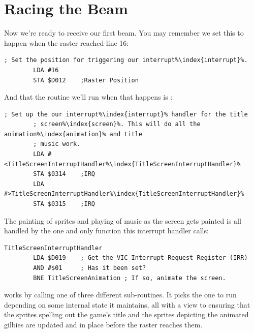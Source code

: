 \section{Racing the Beam}
Now we're ready to receive our first beam. You may remember we set this to happen when the raster reached line 16:

\begin{lstlisting}[caption=In \icode{InitializeSpritesAndInterruptsForTitleScreen\index{InitializeSpritesAndInterruptsForTitleScreen}},escapechar=\%]
        ; Set the position for triggering our interrupt%\index{interrupt}%.
        LDA #16
        STA $D012    ;Raster Position
\end{lstlisting}

And that the routine we'll run when that happens is :

\begin{lstlisting}[caption=In \icode{InitializeSpritesAndInterruptsForTitleScreen\index{InitializeSpritesAndInterruptsForTitleScreen}},escapechar=\%]
        ; Set up the our interrupt%\index{interrupt}% handler for the title
        ; screen%\index{screen}%. This will do all the animation%\index{animation}% and title
        ; music work.
        LDA #<TitleScreenInterruptHandler%\index{TitleScreenInterruptHandler}%
        STA $0314    ;IRQ
        LDA #>TitleScreenInterruptHandler%\index{TitleScreenInterruptHandler}%
        STA $0315    ;IRQ
\end{lstlisting}

The painting of sprites and playing of music as the
screen gets painted is all handled by
 the one and only
function this interrupt handler calls:
\begin{lstlisting}
TitleScreenInterruptHandler
        LDA $D019    ; Get the VIC Interrupt Request Register (IRR)
        AND #$01     ; Has it been set?
        BNE TitleScreenAnimation ; If so, animate the screen.
\end{lstlisting}
 works by calling one of three different sub-routines. It picks the one to run
depending on some internal state it maintains, all with a view to ensuring that the sprites spelling out the game's
title and the sprites depicting the animated gilbies are updated and in place before the raster reaches them.

